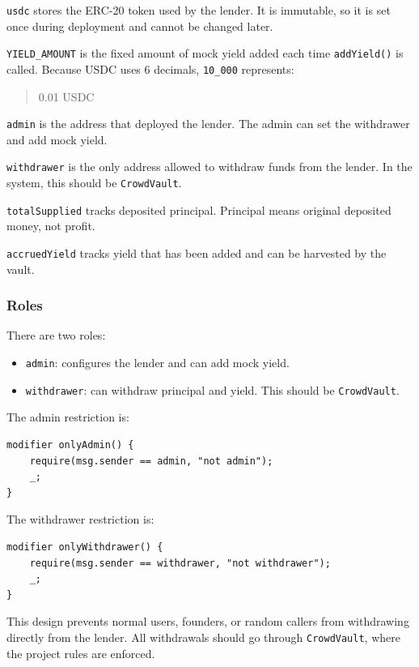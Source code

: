 \documentclass[11pt,a4paper]{article}
\begin{document}
\texttt{usdc} stores the ERC-20 token used by the lender. It is immutable, so it is set once during deployment and cannot be changed later.

\texttt{YIELD\_AMOUNT} is the fixed amount of mock yield added each time \texttt{addYield()} is called. Because USDC uses 6 decimals, \texttt{10\_000} represents:

\begin{quote}
0.01 USDC
\end{quote}

\texttt{admin} is the address that deployed the lender. The admin can set the withdrawer and add mock yield.

\texttt{withdrawer} is the only address allowed to withdraw funds from the lender. In the system, this should be \texttt{CrowdVault}.

\texttt{totalSupplied} tracks deposited principal. Principal means original deposited money, not profit.

\texttt{accruedYield} tracks yield that has been added and can be harvested by the vault.

\subsubsection{Roles}

There are two roles:

\begin{itemize}
  \item \texttt{admin}: configures the lender and can add mock yield.
  \item \texttt{withdrawer}: can withdraw principal and yield. This should be \texttt{CrowdVault}.
\end{itemize}

The admin restriction is:

\begin{lstlisting}
modifier onlyAdmin() {
    require(msg.sender == admin, "not admin");
    _;
}
\end{lstlisting}

The withdrawer restriction is:

\begin{lstlisting}
modifier onlyWithdrawer() {
    require(msg.sender == withdrawer, "not withdrawer");
    _;
}
\end{lstlisting}

This design prevents normal users, founders, or random callers from withdrawing directly from the lender. All withdrawals should go through \texttt{CrowdVault}, where the project rules are enforced.
\end{document}
